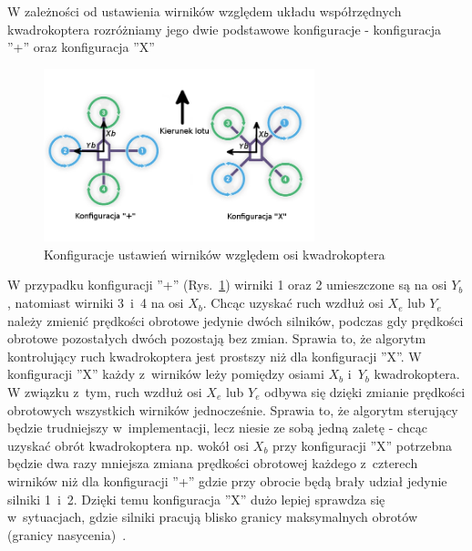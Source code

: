 \documentclass[11pt, twoside]{Thesis} %
\begin{document}
W zależności od ustawienia wirników względem układu współrzędnych kwadrokoptera rozróżniamy jego dwie podstawowe konfiguracje - konfiguracja ''+''  oraz konfiguracja ''X''~\cite{quadro10, quadro11}

\begin{figure}[htbp]
	\centering
		\includegraphics[width=0.7\textwidth]{Pictures/quadrotor_configurations.png}
	\caption[Konfiguracje kwadrokopterów]{Konfiguracje ustawień wirników względem osi kwadrokoptera}
	\label{fig:quadrotor_configurations.png}
\end{figure}

W przypadku konfiguracji ''+'' (Rys.~\ref{fig:quadrotor_configurations.png}) wirniki 1 oraz 2 umieszczone są na osi $Y_b$, natomiast wirniki 3~i~4 na osi $X_b $. Chcąc uzyskać ruch wzdłuż osi $X_e$ lub $Y_e$ należy zmienić prędkości obrotowe jedynie dwóch silników, podczas gdy prędkości obrotowe pozostałych dwóch pozostają bez zmian. Sprawia to, że algorytm kontrolujący ruch kwadrokoptera jest prostszy niż dla konfiguracji ''X''. W konfiguracji ''X'' każdy z~wirników leży pomiędzy osiami $X_b$ i~$Y_b$ kwadrokoptera. W związku z~tym, ruch wzdłuż osi $X_e$ lub $Y_e$ odbywa się dzięki zmianie prędkości obrotowych wszystkich wirników jednocześnie. Sprawia to, że algorytm sterujący będzie trudniejszy w~implementacji, lecz niesie ze sobą jedną zaletę - chcąc uzyskać obrót kwadrokoptera np. wokół osi $X_b$ przy konfiguracji ''X'' potrzebna będzie dwa razy mniejsza zmiana prędkości obrotowej każdego z~czterech wirników niż dla konfiguracji ''+'' gdzie przy obrocie będą brały udział jedynie silniki 1~i~2. Dzięki temu konfiguracja ''X'' dużo lepiej sprawdza się w~sytuacjach, gdzie silniki pracują blisko granicy maksymalnych obrotów (granicy nasycenia)~\cite{quadro11}.
\end{document}
